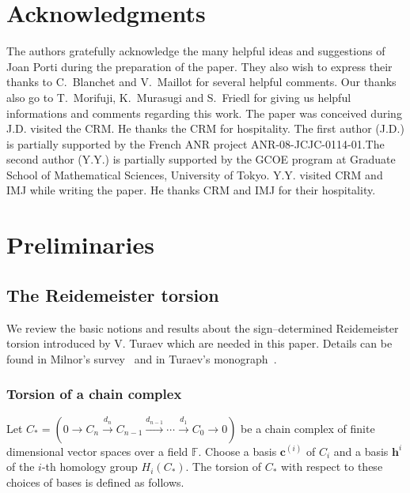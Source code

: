 \documentclass[a4paper]{amsart}
\theoremstyle{plain}
\theoremstyle{definition}
\theoremstyle{remark}
\newcommand{\FF}{{\mathbb F}}
\newcommand{\cbasis}[2][c]{\mathbf{#1}^{#2}}
\newcommand{\hbasis}[2][h]{\mathbf{#1}^{#2}}
\begin{document}
\section*{Acknowledgments}

The authors gratefully acknowledge the many helpful ideas and
suggestions of Joan Porti during the preparation of the paper.  They
also wish to express their thanks to C.~Blanchet and V.~Maillot for
several helpful comments.  
Our thanks also go to T.~Morifuji, K.~Murasugi and S.~Friedl
for giving us helpful informations 
and comments regarding this work.
The paper was conceived during J.D. visited
the CRM. He thanks the CRM for hospitality.  The first author (J.D.) is partially supported by the French ANR project ANR-08-JCJC-0114-01.The second author (Y.Y.)
is partially supported by the GCOE program at Graduate School of
Mathematical Sciences, University of Tokyo. Y.Y. visited CRM and IMJ
while writing the paper. He thanks CRM and IMJ for their hospitality.

\section{Preliminaries}
\label{section:preliminaries}
\subsection{The Reidemeister torsion}
We review the basic notions and results about the sign--determined
Reidemeister torsion introduced by V. Turaev which are needed in this
paper. Details can be found in Milnor's survey~\cite{Milnor:1966} and
in Turaev's monograph~\cite{Turaev:2002}.

\subsubsection*{Torsion of a chain complex}
Let 
$C_* = (
  0 \to 
    C_n \xrightarrow{d_n} 
    C_{n-1} \xrightarrow{d_{n-1}} 
    \cdots \xrightarrow{d_1} 
    C_0 \to 
  0 
)$ 
be a chain complex of finite dimensional vector spaces over a field
$\FF$. Choose a basis $\cbasis{(i)}$ of $C_i$ and a basis $\hbasis{i}$
of the $i$-th homology group $H_i(C_*)$. The torsion of $C_*$ with
respect to these choices of bases is defined as follows.
\end{document}
